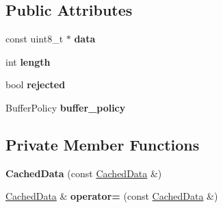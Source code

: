 \subsection*{Public Attributes}
\begin{DoxyCompactItemize}
\item 
const uint8\+\_\+t $\ast$ {\bfseries data}\hypertarget{structv8_1_1_script_compiler_1_1_cached_data_a31e313a969170116f98d5a76c110fe61}{}\label{structv8_1_1_script_compiler_1_1_cached_data_a31e313a969170116f98d5a76c110fe61}

\item 
int {\bfseries length}\hypertarget{structv8_1_1_script_compiler_1_1_cached_data_ad7b8b1b672095a2c33621d3d5b5c7f8f}{}\label{structv8_1_1_script_compiler_1_1_cached_data_ad7b8b1b672095a2c33621d3d5b5c7f8f}

\item 
bool {\bfseries rejected}\hypertarget{structv8_1_1_script_compiler_1_1_cached_data_aa1d16fbd48957df19d4cc1c886afff8f}{}\label{structv8_1_1_script_compiler_1_1_cached_data_aa1d16fbd48957df19d4cc1c886afff8f}

\item 
Buffer\+Policy {\bfseries buffer\+\_\+policy}\hypertarget{structv8_1_1_script_compiler_1_1_cached_data_a1e5c9ff625ac790139aec4294493fe32}{}\label{structv8_1_1_script_compiler_1_1_cached_data_a1e5c9ff625ac790139aec4294493fe32}

\end{DoxyCompactItemize}
\subsection*{Private Member Functions}
\begin{DoxyCompactItemize}
\item 
{\bfseries Cached\+Data} (const \hyperlink{structv8_1_1_script_compiler_1_1_cached_data}{Cached\+Data} \&)\hypertarget{structv8_1_1_script_compiler_1_1_cached_data_a106962bbaf8753194846eea24f5f952a}{}\label{structv8_1_1_script_compiler_1_1_cached_data_a106962bbaf8753194846eea24f5f952a}

\item 
\hyperlink{structv8_1_1_script_compiler_1_1_cached_data}{Cached\+Data} \& {\bfseries operator=} (const \hyperlink{structv8_1_1_script_compiler_1_1_cached_data}{Cached\+Data} \&)\hypertarget{structv8_1_1_script_compiler_1_1_cached_data_a6f7dcbf54e78b8f0c9bd03321217d84e}{}\label{structv8_1_1_script_compiler_1_1_cached_data_a6f7dcbf54e78b8f0c9bd03321217d84e}

\end{DoxyCompactItemize}


